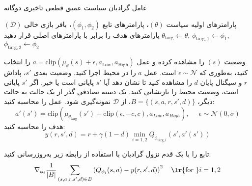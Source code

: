   \begin{algorithm}[H]
  	\caption{عامل گرادیان سیاست عمیق قطعی تاخیری دوگانه}\label{alg:TD3}
  	\begin{algorithmic}[1]
  		 پارامترهای اولیه سیاست
  		$(\theta)$، پارامترهای تابع
  		$(\phi_1, \phi_2)$،
  		 بافر بازی خالی $(\mathcal{D})$
  		\State پارامترهای هدف را برابر با پارامترهای اصلی قرار دهید
  		$\theta_{\text{targ}} \leftarrow \theta$,
  		 $\phi_{\text{targ}, 1} \leftarrow \phi_1$,
  		  $\phi_{\text{targ}, 2} \leftarrow \phi_2$
  		
  		\State 
  		وضعیت $(s)$ را مشاهده کرده و عمل 
  		$a = \text{clip}(\mu_{\theta}(s) + \epsilon, a_{\text{Low}}, a_{\text{High}})$
  		 را انتخاب کنید، به‌طوری که $\epsilon \sim \mathcal{N}$ است.
  		\State عمل $a$ را در محیط اجرا کنید.
  		\State 
  		وضعیت بعدی $s'$، پاداش $r$ و سیگنال پایان $d$ را مشاهده کنید تا نشان دهد آیا $s'$ پایانی است یا خیر.
  		\State اگر $s'$ پایانی است، وضعیت محیط را بازنشانی کنید.
  		\State یک دسته تصادفی گذر از ‌یک حالت به حالت دیگر، $B = \{ (s,a,r,s',d) \}$، از $\mathcal{D}$ نمونه‌گیری شود.
  		\State
  		عمل را محاسبه کنید:
  		\begin{equation*}
  			 a'(s') = \text{clip}\left(\mu_{\theta_{\text{targ}}}(s') + \text{clip}(\epsilon,-c,c), a_{Low}, a_{High}\right), \;\;\;\;\; \epsilon \sim \mathcal{N}(0, \sigma) 
  		\end{equation*}
  		\State
  		هدف را محاسبه کنید:
  		\begin{equation*}
  			 y(r,s',d) = r + \gamma (1-d) \min_{i=1,2} Q_{\phi_{\text{targ},i}}(s', a'(s')) 
  		\end{equation*}
  		
  		\State تابع  را با یک قدم نزول گرادیان با استفاده از رابطه زیر به‌روزرسانی کنید:
  		\begin{align*} 
  			 \nabla_{\phi_i} \frac{1}{|B|}\sum_{(s,a,r,s',d) \in B} \left( Q_{\phi_i}(s,a) - y(r,s',d) \right)^2 
  			 \quad \text{\lr{for }}i=1,2 
  		\end{align*}
  		

\end{algorithmic}
\end{algorithm}
